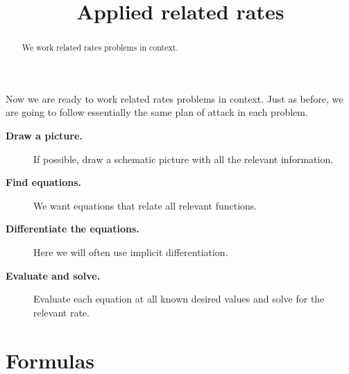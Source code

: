 \documentclass{ximera}
\title[Dig-In:]{Applied related rates}
\begin{document}
\begin{abstract}
  We work related rates problems in context.
\end{abstract}
\maketitle

Now we are ready to work related rates problems in context. Just as
before, we are going to follow essentially the same plan of attack in
each problem.


\begin{description}
\item[\textbf{Draw a picture.}] If possible, draw a schematic picture with all the relevant information. 
\item[\textbf{Find equations.}] We want equations that relate all
  relevant functions.
\item[\textbf{Differentiate the equations.}] Here we will often use
  implicit differentiation.
\item[\textbf{Evaluate and solve.}] Evaluate
  each equation at all known desired values and solve for the relevant
  rate.
\end{description}



\section{Formulas}
\end{document}
